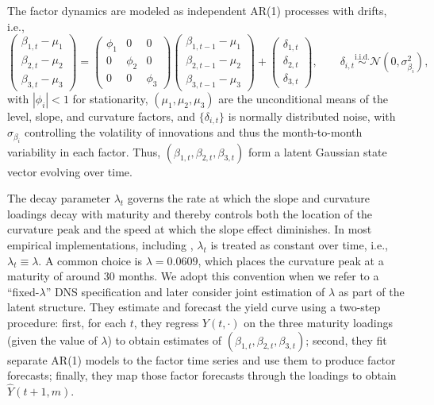 \documentclass[
  12pt]{article}
\begin{document}
The factor dynamics are modeled as independent AR(1) processes with drifts, i.e.,
\[
\begin{pmatrix}
\beta_{1,t}-\mu_1\\[2pt]
\beta_{2,t}-\mu_2\\[2pt]
\beta_{3,t}-\mu_3
\end{pmatrix}
=
\begin{pmatrix}
\phi_1 & 0 & 0\\
0 & \phi_2 & 0\\
0 & 0 & \phi_3
\end{pmatrix}
\begin{pmatrix}
\beta_{1,t-1}-\mu_1\\[2pt]
\beta_{2,t-1}-\mu_2\\[2pt]
\beta_{3,t-1}-\mu_3
\end{pmatrix}
+
\begin{pmatrix}
\delta_{1,t}\\[2pt]
\delta_{2,t}\\[2pt]
\delta_{3,t}
\end{pmatrix},
\qquad
\delta_{i,t}\stackrel{\text{i.i.d.}}{\sim}\mathcal{N}(0,\sigma_{\beta_i}^2),
\]
with $|\phi_i|<1$ for stationarity, $(\mu_1, \mu_2,\mu_3)$ are the unconditional means of the level, slope, and curvature factors, and $\{\delta_{i,t}\}$ is normally distributed noise, with $\sigma_{\beta_i}$ controlling the volatility of innovations and thus the month-to-month variability in each factor. Thus, $(\beta_{1,t},\beta_{2,t},\beta_{3,t})$ form a latent Gaussian state vector evolving over time.

The decay parameter $\lambda_t$ governs the rate at which the slope and curvature loadings decay with maturity and thereby controls both the location of the curvature peak and the speed at which the slope effect diminishes. In most empirical implementations, including \cite{diebold2006forecasting}, $\lambda_t$ is treated as constant over time, i.e., $\lambda_t\equiv\lambda$. A common choice is $\lambda=0.0609$, which places the curvature peak at a maturity of around 30 months. We adopt this convention when we refer to a ``fixed-$\lambda$'' DNS specification and later consider joint estimation of $\lambda$ as part of the latent structure. They estimate and forecast the yield curve using a two-step procedure: first, for each $t$, they regress $Y(t,\cdot)$ on the three maturity loadings (given the value of $\lambda$) to obtain estimates of $(\beta_{1,t},\beta_{2,t},\beta_{3,t})$; second, they fit separate AR(1) models to the factor time series and use them to produce factor forecasts; finally, they map those factor forecasts through the loadings to obtain $\widehat{Y}(t+1,m)$.
\end{document}
